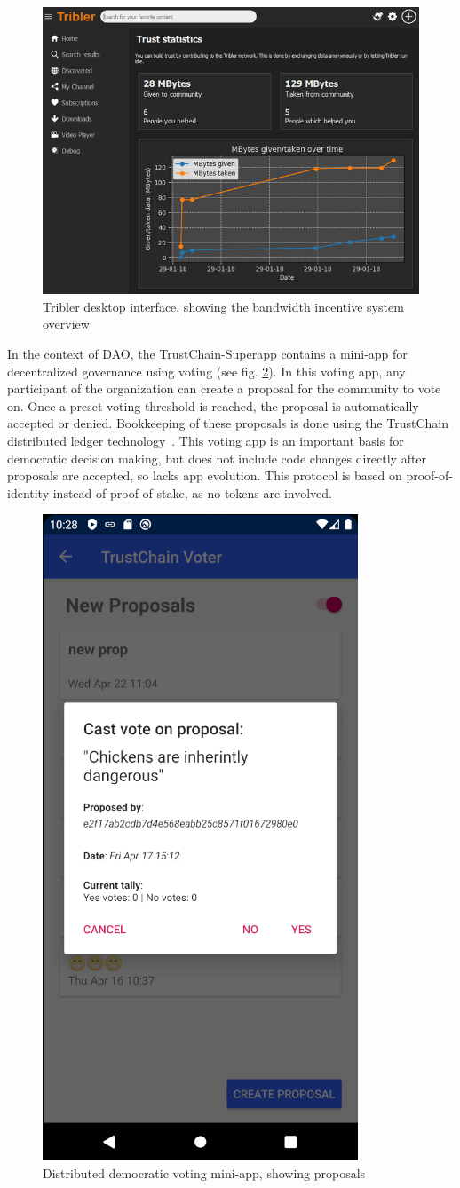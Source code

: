 \begin{figure}
        \includegraphics[width=1\linewidth]{related-work/tribler7.3.0.png}
        \caption{Tribler desktop interface, showing the bandwidth incentive system overview}
        \label{fig:tribler}
    \endminipage
\end{figure}

In the context of DAO, the TrustChain-Superapp contains a mini-app for decentralized governance using voting (see fig. \ref{fig:trustchain-superapp-voter}). In this voting app, any participant of the organization can create a proposal for the community to vote on. Once a preset voting threshold is reached, the proposal is automatically accepted or denied. Bookkeeping of these proposals is done using the TrustChain distributed ledger technology~\citep{otte2017trustchain}. This voting app is an important basis for democratic decision making, but does not include code changes directly after proposals are accepted, so lacks app evolution. This protocol is based on proof-of-identity instead of proof-of-stake, as no tokens are involved.

\begin{figure}
    \centering
    \includegraphics[width=0.3\linewidth]{related-work/trustchain-superapp-voter.png}
    \caption{Distributed democratic voting mini-app, showing proposals}
    \label{fig:trustchain-superapp-voter}
\end{figure}

